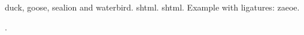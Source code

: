\documentclass{article}
\begin{document}
\Gls{duck}, \gls{goose}, \gls{sealion} and \gls{waterbird}.
\Gls{shtml}. \Gls{shtml}. Example with ligatures: \gls{zaeoe}.

.

\printunsrtglossaries
\end{document}

